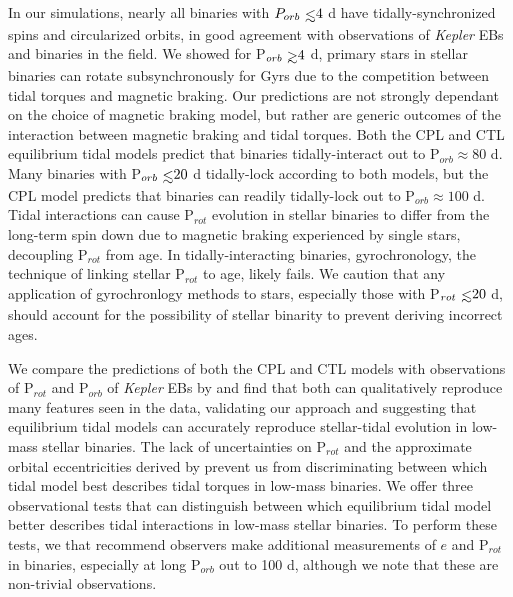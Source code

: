 \documentclass[twocolumn]{aastex61}
\def\gsim{~\rlap{$>$}{\lower 1.0ex\hbox{$\sim$}}}
\def\lsim{~\rlap{$<$}{\lower 1.0ex\hbox{$\sim$}}}
\newcommand{\kepler}[0]{\textit{Kepler}\xspace}
\begin{document}
In our simulations, nearly all binaries with $P_{orb} \lsim 4$ d have tidally-synchronized spins and circularized orbits, in good agreement with observations of \kepler EBs and binaries in the field. We showed for P$_{orb} \gsim 4$ d, primary stars in stellar binaries can rotate subsynchronously for Gyrs due to the competition between tidal torques and magnetic braking. Our predictions are not strongly dependant on the choice of magnetic braking model, but rather are generic outcomes of the interaction between magnetic braking and tidal torques.  Both the CPL and CTL equilibrium tidal models predict that binaries tidally-interact out to P$_{orb} \approx 80$ d. Many binaries with P$_{orb} \lsim 20$ d tidally-lock according to both models, but the CPL model predicts that binaries can readily tidally-lock out to P$_{orb} \approx 100$ d. Tidal interactions can cause P$_{rot}$ evolution in stellar binaries to differ from the long-term spin down due to magnetic braking experienced by single stars, decoupling P$_{rot}$ from age.  In tidally-interacting binaries, gyrochronology, the technique of linking stellar P$_{rot}$ to age, likely fails. We caution that any application of gyrochronlogy methods to stars, especially those with P$_{rot} \lsim 20$ d, should account for the possibility of stellar binarity to prevent deriving incorrect ages.  

We compare the predictions of both the CPL and CTL models with observations of P$_{rot}$ and P$_{orb}$ of \kepler EBs by \citet{Lurie2017} and find that both can qualitatively reproduce many features seen in the data, validating our approach and suggesting that equilibrium tidal models can accurately reproduce stellar-tidal evolution in low-mass stellar binaries. The lack of uncertainties on P$_{rot}$ and the approximate orbital eccentricities derived by \citet{Lurie2017} prevent us from discriminating between which tidal model best describes tidal torques in low-mass binaries.  We offer three observational tests that can distinguish between which equilibrium tidal model better describes tidal interactions in low-mass stellar binaries.  To perform these tests, we that recommend observers make additional measurements of $e$ and P$_{rot}$ in binaries, especially at long P$_{orb}$ out to 100 d, although we note that these are non-trivial observations.
\end{document}
